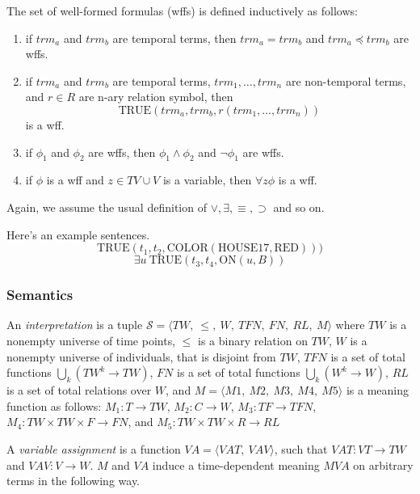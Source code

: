 The set of well-formed formulas (wffs) is defined inductively as follows:
\begin{enumerate}
  \item if $trm_a$ and $trm_b$ are temporal terms, then $trm_a = trm_b$ and $trm_a \preceq trm_b$ are wffs.
  \item if $trm_a$ and $trm_b$ are temporal terms, $trm_1, \dots, trm_n$ are non-temporal terms, and $r \in R$ are n-ary relation symbol,
    then 
    \[
      \text{TRUE}(trm_a, trm_b, r(trm_1, \dots, trm_n))
    \]
    is a wff.
  \item if $\phi_1$ and $\phi_2$ are wffs, then $\phi_1 \land \phi_2$ and $\neg \phi_1$ are wffs.
  \item if $\phi$ is a wff and $z \in TV \cup V$ is a variable, then $\forall z \phi$ is a wff.
\end{enumerate}

Again, we assume the usual definition of $\lor, \exists, \equiv, \supset$ and so on. 

\begin{exmp} Here's an example sentences.
  \begin{equation}
    \text{TRUE}(t_1, t_2, \text{COLOR}(\text{HOUSE17}, \text{RED})))
  \end{equation}
  \begin{equation}
  \exists u \ \text{TRUE}(t_3, t_4, \text{ON}(u,B))
  \end{equation}
\end{exmp}

\subsubsection{Semantics}
An \textit{interpretation} is a tuple $\mathscr{S} = \langle  TW,\ \leqslant,\ W,\ TFN,\ FN,\ RL,\ M\rangle$ where $TW$ 
is a nonempty universe of time points, $\leqslant$ is a binary relation on $TW$, $W$ is a nonempty universe of individuals,
that is disjoint from $TW$, $TFN$ is a set of total functions $\bigcup_k (TW^k \rightarrow TW)$, 
$FN$ is a set of total functions $ \bigcup_k (W^k \rightarrow W)$, $RL$ is a set of total relations over $W$, and 
$M = \langle M1,\ M2,\ M3,\ M4,\ M5 \rangle$ is a meaning function as follows: $M_1 : T \rightarrow TW$,
$M_2: C \to W$, $M_3 : TF \to TFN$, $M_4 : TW \times TW \times F \to FN$, and $M_5: TW \times TW \times R \to RL$

A \textit{variable assignment} is a function $ VA = \langle VAT,\ VAV \rangle$, such that $VAT: VT \to TW$ and 
$VAV: V \to W$. $M$ and $VA$ induce a time-dependent meaning $MVA$ on arbitrary terms in the following way.

